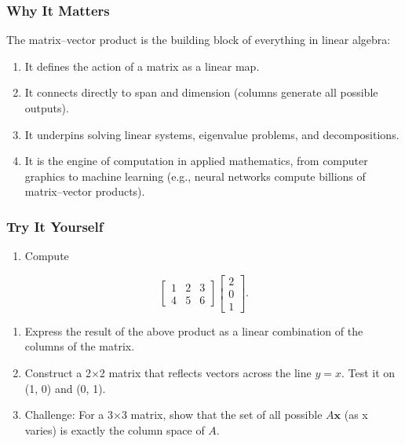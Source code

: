 \documentclass[
  letterpaper,
  DIV=11,
  numbers=noendperiod]{scrreprt}
\providecommand{\tightlist}{%
  \setlength{\itemsep}{0pt}\setlength{\parskip}{0pt}}
\begin{document}
\subsubsection{Why It Matters}\label{why-it-matters-10}

The matrix--vector product is the building block of everything in linear
algebra:

\begin{enumerate}
\def\labelenumi{\arabic{enumi}.}
\tightlist
\item
  It defines the action of a matrix as a linear map.
\item
  It connects directly to span and dimension (columns generate all
  possible outputs).
\item
  It underpins solving linear systems, eigenvalue problems, and
  decompositions.
\item
  It is the engine of computation in applied mathematics, from computer
  graphics to machine learning (e.g., neural networks compute billions
  of matrix--vector products).
\end{enumerate}

\subsubsection{Try It Yourself}\label{try-it-yourself-13}

\begin{enumerate}
\def\labelenumi{\arabic{enumi}.}
\tightlist
\item
  Compute
\end{enumerate}

\[
\begin{bmatrix} 
1 & 2 & 3 \\ 
4 & 5 & 6 
\end{bmatrix}
\begin{bmatrix} 
2 \\ 
0 \\ 
1 
\end{bmatrix}.
\]

\begin{enumerate}
\def\labelenumi{\arabic{enumi}.}
\setcounter{enumi}{1}
\item
  Express the result of the above product as a linear combination of the
  columns of the matrix.
\item
  Construct a 2×2 matrix that reflects vectors across the line
  \(y = x\). Test it on (1, 0) and (0, 1).
\item
  Challenge: For a 3×3 matrix, show that the set of all possible
  \(A\mathbf{x}\) (as x varies) is exactly the column space of \(A\).
\end{enumerate}
\end{document}
